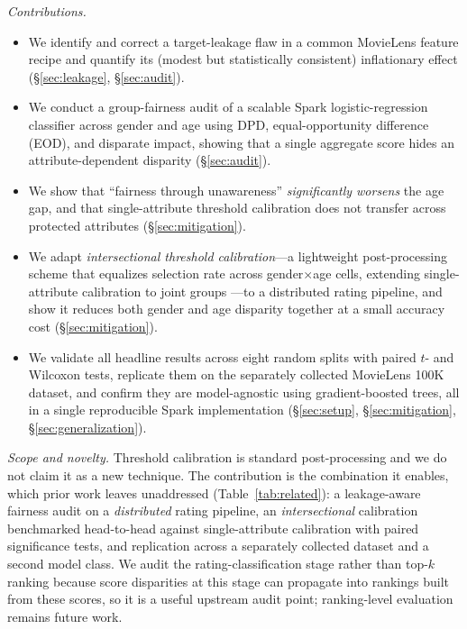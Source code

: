 \documentclass[conference]{IEEEtran}
\begin{document}
\textit{Contributions.}
\begin{itemize}
  \item We identify and correct a target-leakage flaw in a common MovieLens
  feature recipe and quantify its (modest but statistically consistent) inflationary
  effect (\S\ref{sec:leakage}, \S\ref{sec:audit}).
  \item We conduct a group-fairness audit of a scalable Spark logistic-regression
  classifier across gender and age using DPD, equal-opportunity difference (EOD),
  and disparate impact, showing that a single aggregate score hides an
  attribute-dependent disparity (\S\ref{sec:audit}).
  \item We show that ``fairness through unawareness'' \emph{significantly worsens} the
  age gap, and that single-attribute threshold calibration does not transfer across
  protected attributes (\S\ref{sec:mitigation}).
  \item We adapt \emph{intersectional threshold calibration}---a lightweight
  post-processing scheme that equalizes selection rate across gender$\times$age cells,
  extending single-attribute calibration \cite{hardt2016equality} to joint groups
  \cite{foulds2020intersectional,kearns2018gerrymandering}---to a distributed rating
  pipeline, and show it reduces both gender and age disparity together at a small accuracy
  cost (\S\ref{sec:mitigation}).
  \item We validate all headline results across eight random splits with paired
  $t$- and Wilcoxon tests, replicate them on the separately collected MovieLens 100K
  dataset, and confirm they are model-agnostic using gradient-boosted trees, all in a
  single reproducible Spark implementation
  (\S\ref{sec:setup}, \S\ref{sec:mitigation}, \S\ref{sec:generalization}).
\end{itemize}

\textit{Scope and novelty.} Threshold calibration is standard post-processing and we
do not claim it as a new technique. The contribution is the combination it enables,
which prior work leaves unaddressed (Table~\ref{tab:related}): a leakage-aware
fairness audit on a \emph{distributed} rating pipeline, an \emph{intersectional}
calibration benchmarked head-to-head against single-attribute calibration with paired
significance tests, and replication across a separately collected dataset and a second
model class. We audit the rating-classification stage rather than top-$k$ ranking
because score disparities at this stage can propagate into rankings built from these
scores, so it is a useful upstream audit point; ranking-level evaluation remains future
work.
\end{document}

